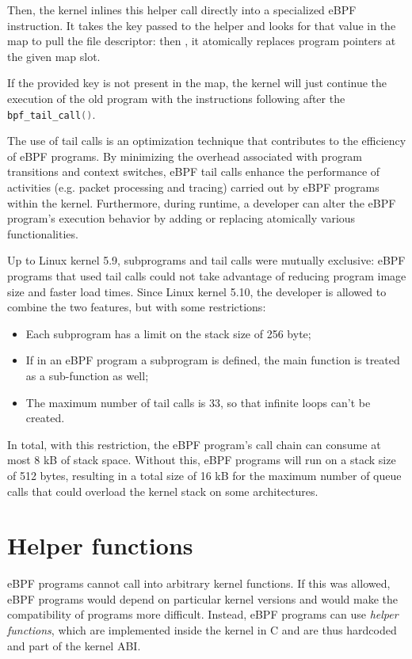 Then, the kernel inlines this helper call directly into a specialized eBPF instruction.
It takes the key passed to the helper and looks for that value in the map to pull the file descriptor: then , it atomically replaces program pointers at the given map slot. 

If the provided key is not present in the map, the kernel will just continue the execution of the old program with the instructions following after the \colorbox{backcolour}{\lstinline[style=cstyle, language=C]|bpf_tail_call()|}.

The use of tail calls is an optimization technique that contributes to the efficiency of eBPF programs. 
By minimizing the overhead associated with program transitions and context switches, eBPF tail calls enhance the performance of activities (e.g. packet processing and tracing) carried out by eBPF programs within the kernel.
Furthermore, during runtime, a developer can alter the eBPF program's execution behavior by adding or replacing atomically various functionalities.

Up to Linux kernel 5.9, subprograms and tail calls were mutually exclusive: eBPF programs that used tail calls could not take advantage of reducing program image size and faster load times.
Since Linux kernel 5.10, the developer is allowed to combine the two features, but with some restrictions:

\begin{itemize}
	\item 
		Each subprogram has a limit on the stack size of 256 byte;
	\item 
		If in an eBPF program a subprogram is defined, the main function is treated as a sub-function as well;
	\item 
		The maximum number of tail calls is 33, so that infinite loops can't be created.
\end{itemize}

In total, with this restriction, the eBPF program’s call chain can consume at most 8 kB of stack space. 
Without this, eBPF programs will run on a stack size of 512 bytes, resulting in a total size of 16 kB for the maximum number of queue calls that could overload the kernel stack on some architectures.

\section{Helper functions}

eBPF programs cannot call into arbitrary kernel functions. 
If this was allowed, eBPF programs would depend on particular kernel versions and would make the compatibility of programs more difficult. 
Instead, eBPF programs can use \textit{helper functions}, which are implemented inside the kernel in C and are thus hardcoded and part of the kernel ABI. 

